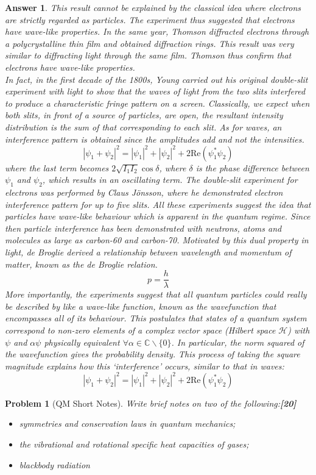 \documentclass[a4paper]{article}
\newtheorem{ans}{Answer}[subsection]
\theoremstyle{new}
\newtheorem{qns}{Problem}[subsection]
\begin{document}
\begin{ans}
This result cannot be explained by the classical idea where electrons are strictly regarded as particles. The experiment thus suggested that electrons have wave-like properties. In the same year, Thomson diffracted electrons through a polycrystalline thin film and obtained diffraction rings. This result was very similar to diffracting light through the same film. Thomson thus confirm that electrons have wave-like properties.\\[5pt]
In fact, in the first decade of the 1800s, Young carried out his original double-slit experiment with light to show that the waves of light from the two slits interfered to produce a characteristic fringe pattern on a screen. Classically, we expect when both slits, in front of a source of particles, are open, the resultant intensity distribution is the sum of that corresponding to each slit. As for waves, an interference pattern is obtained since the amplitudes add and not the intensities.
$$|\psi_1+\psi_2|^2=|\psi_1|^2+|\psi_2|^2+2\text{Re}(\psi_1^*\psi_2)$$
where the last term becomes $2\sqrt{I_1I_2}\cos\delta$, where $\delta$ is the phase difference between $\psi_1$ and $\psi_2$, which results in an oscillating term. The double-slit experiment for electrons was performed by Claus J\"{o}nsson, where he demonstrated electron interference pattern for up to five slits. All these experiments suggest the idea that particles have wave-like behaviour which is apparent in the quantum regime. Since then particle interference has been demonstrated with neutrons, atoms and molecules as large as carbon-60 and carbon-70. Motivated by this dual property in light, de Broglie derived a relationship between wavelength and momentum of matter, known as the de Broglie relation.
$$p=\frac{h}{\lambda}$$
More importantly, the experiments suggest that all quantum particles could really be described by like a wave-like function, known as the wavefunction that encompasses all of its behaviour. This postulates that states of a quantum system correspond to non-zero elements of a complex vector space (Hilbert space $\mathcal{H}$) with $\psi$ and $\alpha\psi$ physically equivalent $\forall\alpha\in\mathbb{C}\backslash\{0\}$. In particular, the norm squared of the wavefunction gives the probability density.  This process of taking the square magnitude explains how this `interference' occurs, similar to that in waves:
$$|\psi_1+\psi_2|^2=|\psi_1|^2+|\psi_2|^2+2\text{Re}(\psi_1^*\psi_2)$$
\end{ans}
\newpage
\begin{qns}[QM Short Notes]
Write brief notes on two of the following:\hfill\textbf{[20]}
\begin{itemize}
    \item symmetries and conservation laws in quantum mechanics;
    \item the vibrational and rotational specific heat capacities of gases;
    \item blackbody radiation
\end{itemize}
\end{qns}
\end{document}
